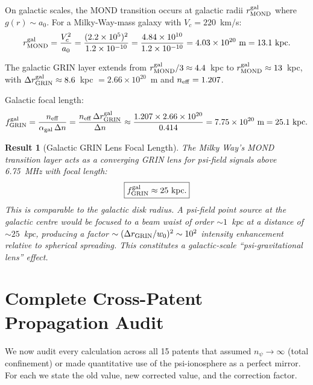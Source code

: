 \documentclass[aps,prd,twocolumn,superscriptaddress]{revtex4-2}
\newcommand{\npsi}{n_\psi}
\newcommand{\ee}[1]{\times 10^{#1}}
\newtheorem{result}{Result}
\begin{document}
On galactic scales, the MOND transition occurs at galactic radii
$r_{\rm MOND}^{\rm gal}$ where $g(r) \sim a_0$.  For a Milky-Way-mass
galaxy with $V_c = 220$~km/s:
\begin{equation}
r_{\rm MOND}^{\rm gal} = \frac{V_c^2}{a_0}
= \frac{(2.2\ee5)^2}{1.2\ee{-10}} = \frac{4.84\ee{10}}{1.2\ee{-10}}
= 4.03\ee{20}~\text{m} = 13.1~\text{kpc}.
\label{eq:r-MOND-gal}
\end{equation}

The galactic GRIN layer extends from $r_{\rm MOND}^{\rm gal}/3 \approx 4.4$~kpc
to $r_{\rm MOND}^{\rm gal} \approx 13$~kpc, with $\Delta r_{\rm GRIN}^{\rm gal}
\approx 8.6$~kpc $= 2.66\ee{20}$~m and $n_{\rm eff} = 1.207$.

Galactic focal length:
\begin{equation}
f_{\rm GRIN}^{\rm gal}
= \frac{n_{\rm eff}}{\alpha_{\rm gal}\,\Delta n}
= \frac{n_{\rm eff}\,\Delta r_{\rm GRIN}^{\rm gal}}{\Delta n}
\approx \frac{1.207 \times 2.66\ee{20}}{0.414}
= 7.75\ee{20}~\text{m} = 25.1~\text{kpc}.
\label{eq:f-GRIN-gal}
\end{equation}

\begin{result}[Galactic GRIN Lens Focal Length]
\label{res:GRIN}
The Milky Way's MOND transition layer acts as a converging GRIN lens
for psi-field signals above 6.75~MHz with focal length:
\begin{equation}
\boxed{f_{\rm GRIN}^{\rm gal} \approx 25~\text{kpc}.}
\end{equation}
This is comparable to the galactic disk radius.  A psi-field point
source at the galactic centre would be focused to a beam waist of
order $\sim 1$~kpc at a distance of $\sim 25$~kpc, producing a factor
$\sim (\Delta r_{\rm GRIN}/w_0)^2 \sim 10^2$ intensity enhancement
relative to spherical spreading.  This constitutes a galactic-scale
``psi-gravitational lens'' effect.
\end{result}

\section{Complete Cross-Patent Propagation Audit}
\label{sec:audit}

We now audit every calculation across all 15 patents that assumed
$\npsi \to \infty$ (total confinement) or made quantitative use of the
psi-ionosphere as a perfect mirror.  For each we state the old value,
new corrected value, and the correction factor.
\end{document}
